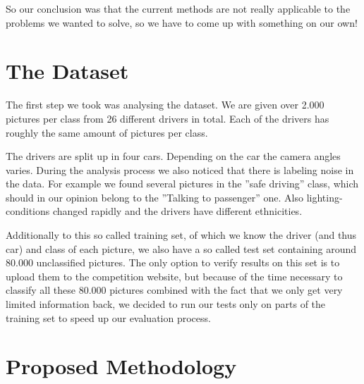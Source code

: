 \documentclass[10pt,twocolumn,letterpaper]{article}
\begin{document}
So our conclusion was that the current methods are not really applicable to the problems we wanted to solve, so we have to come up with something on our own!



\section{The Dataset}
The first step we took was analysing the dataset. We are given over 2.000 pictures per class from 26 different drivers in total. Each of the drivers has roughly the same amount of pictures per class. 

The drivers are split up in four cars. Depending on the car the camera angles varies. During the analysis process we also noticed that there is labeling noise in the data. For example we found several pictures in the ''safe driving'' class, which should in our opinion belong to the ''Talking to passenger'' one. Also lighting-conditions changed rapidly and the drivers have different ethnicities.


Additionally to this so called training set, of which we know the driver (and thus car) and class of each picture, we also have a so called test set containing around 80.000 unclassified pictures. The only option to verify results on this set is to upload them to the competition website, but because of the time necessary to classify all these 80.000 pictures combined with the fact that we only get very limited information back, we decided to run our tests only on parts of the training set to speed up our evaluation process.







\section{Proposed Methodology}
\end{document}
